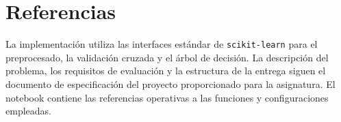 \chapter{Referencias} \label{chp:references}


La implementación utiliza las interfaces estándar de \texttt{scikit-learn}
para el preprocesado, la validación cruzada y el árbol de decisión. La
descripción del problema, los requisitos de evaluación y la estructura de la
entrega siguen el documento de especificación del proyecto proporcionado para
la asignatura. El notebook contiene las referencias operativas a las funciones
y configuraciones empleadas.
